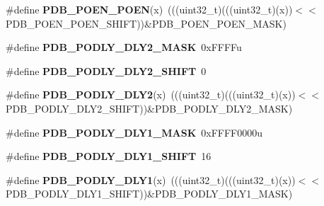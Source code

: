 \begin{DoxyCompactItemize}
\item 
\#define {\bfseries P\+D\+B\+\_\+\+P\+O\+E\+N\+\_\+\+P\+O\+EN}(x)~(((uint32\+\_\+t)(((uint32\+\_\+t)(x))$<$$<$P\+D\+B\+\_\+\+P\+O\+E\+N\+\_\+\+P\+O\+E\+N\+\_\+\+S\+H\+I\+FT))\&P\+D\+B\+\_\+\+P\+O\+E\+N\+\_\+\+P\+O\+E\+N\+\_\+\+M\+A\+SK)\hypertarget{group__PDB__Register__Masks_gaf0b83a8c4124b3bdf53e5173d121db0f}{}\label{group__PDB__Register__Masks_gaf0b83a8c4124b3bdf53e5173d121db0f}

\item 
\#define {\bfseries P\+D\+B\+\_\+\+P\+O\+D\+L\+Y\+\_\+\+D\+L\+Y2\+\_\+\+M\+A\+SK}~0x\+F\+F\+F\+Fu\hypertarget{group__PDB__Register__Masks_ga1b7c6a0b290ea82908b74e7b8c2f4009}{}\label{group__PDB__Register__Masks_ga1b7c6a0b290ea82908b74e7b8c2f4009}

\item 
\#define {\bfseries P\+D\+B\+\_\+\+P\+O\+D\+L\+Y\+\_\+\+D\+L\+Y2\+\_\+\+S\+H\+I\+FT}~0\hypertarget{group__PDB__Register__Masks_gaa576ed647be6411616c3f6e6d03ab47c}{}\label{group__PDB__Register__Masks_gaa576ed647be6411616c3f6e6d03ab47c}

\item 
\#define {\bfseries P\+D\+B\+\_\+\+P\+O\+D\+L\+Y\+\_\+\+D\+L\+Y2}(x)~(((uint32\+\_\+t)(((uint32\+\_\+t)(x))$<$$<$P\+D\+B\+\_\+\+P\+O\+D\+L\+Y\+\_\+\+D\+L\+Y2\+\_\+\+S\+H\+I\+FT))\&P\+D\+B\+\_\+\+P\+O\+D\+L\+Y\+\_\+\+D\+L\+Y2\+\_\+\+M\+A\+SK)\hypertarget{group__PDB__Register__Masks_ga47e4784ba83a37ab49598af71889500c}{}\label{group__PDB__Register__Masks_ga47e4784ba83a37ab49598af71889500c}

\item 
\#define {\bfseries P\+D\+B\+\_\+\+P\+O\+D\+L\+Y\+\_\+\+D\+L\+Y1\+\_\+\+M\+A\+SK}~0x\+F\+F\+F\+F0000u\hypertarget{group__PDB__Register__Masks_ga548246bef07975bd6f1fe0fe5a2c6ef5}{}\label{group__PDB__Register__Masks_ga548246bef07975bd6f1fe0fe5a2c6ef5}

\item 
\#define {\bfseries P\+D\+B\+\_\+\+P\+O\+D\+L\+Y\+\_\+\+D\+L\+Y1\+\_\+\+S\+H\+I\+FT}~16\hypertarget{group__PDB__Register__Masks_ga0890f882369124f86428eea14c2eac88}{}\label{group__PDB__Register__Masks_ga0890f882369124f86428eea14c2eac88}

\item 
\#define {\bfseries P\+D\+B\+\_\+\+P\+O\+D\+L\+Y\+\_\+\+D\+L\+Y1}(x)~(((uint32\+\_\+t)(((uint32\+\_\+t)(x))$<$$<$P\+D\+B\+\_\+\+P\+O\+D\+L\+Y\+\_\+\+D\+L\+Y1\+\_\+\+S\+H\+I\+FT))\&P\+D\+B\+\_\+\+P\+O\+D\+L\+Y\+\_\+\+D\+L\+Y1\+\_\+\+M\+A\+SK)\hypertarget{group__PDB__Register__Masks_gae6b4c6aa88511e952d5cd0938d11d854}{}\label{group__PDB__Register__Masks_gae6b4c6aa88511e952d5cd0938d11d854}


\end{DoxyCompactItemize}
